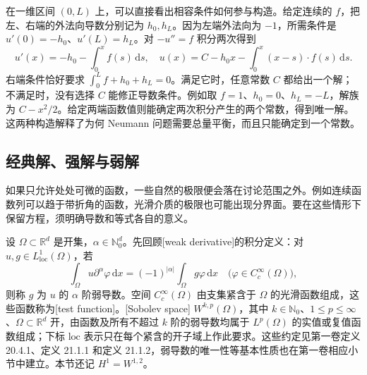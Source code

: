 在一维区间 \((0,L)\) 上，可以直接看出相容条件如何参与构造。给定连续的 \(f\)，把左、右端的外法向导数分别记为 \(h_0,h_L\)。因为左端外法向为 \(-1\)，所需条件是 \(u'(0)=-h_0\)、\(u'(L)=h_L\)。对 \(-u''=f\) 积分两次得到
\[
 u'(x)=-h_0-\int_0^x f(s)\,\mathrm ds,\quad
 u(x)=C-h_0x-\int_0^x(x-s)\cdot f(s)\,\mathrm ds.
\]
右端条件恰好要求 \(\int_0^L f+h_0+h_L=0\)。满足它时，任意常数 \(C\) 都给出一个解；不满足时，没有选择 \(C\) 能修正导数条件。例如取 \(f=1\)、\(h_0=0\)、\(h_L=-L\)，解族为 \(C-x^2/2\)。给定两端函数值则能确定两次积分产生的两个常数，得到唯一解。这两种构造解释了为何 Neumann 问题需要总量平衡，而且只能确定到一个常数。

\subsection{经典解、强解与弱解}
\label{b2:subsec:010405}

如果只允许处处可微的函数，一些自然的极限便会落在讨论范围之外。例如连续函数列可以趋于带折角的函数，光滑介质的极限也可能出现分界面。要在这些情形下保留方程，须明确导数和等式各自的意义。

\ProseParagraphBreak

设 \(\Omega\subset\mathbb R^d\) 是开集，\(\alpha\in\mathbb N_0^d\)。先回顾[weak derivative]的积分定义：对 \(u,g\in L^1_{\mathrm{loc}}(\Omega)\)，若
\[
\int_\Omega u\partial^\alpha\varphi\,\mathrm{d}x
=(-1)^{|\alpha|}\int_\Omega g\varphi\,\mathrm{d}x
\quad\bigl(\varphi\in C_c^\infty(\Omega)\bigr),
\]
则称 \(g\) 为 \(u\) 的 \(\alpha\) 阶弱导数。空间 \(C_c^\infty(\Omega)\) 由支集紧含于 \(\Omega\) 的光滑函数组成，这些函数称为[test function]。[Sobolev space] \(W^{k,p}(\Omega)\)，其中 \(k\in\mathbb N_0\)、\(1\le p\le\infty\)、\(\Omega\subset\mathbb R^d\) 开，由函数及所有不超过 \(k\) 阶的弱导数均属于 \(L^p(\Omega)\) 的实值或复值函数组成；下标 \(\mathrm{loc}\) 表示只在每个紧含的开子域上作此要求。这些约定见第一卷定义 20.4.1、定义 21.1.1 和定义 21.1.2，弱导数的唯一性等基本性质也在第一卷相应小节中建立。本节还记 \(H^1=W^{1,2}\)。


